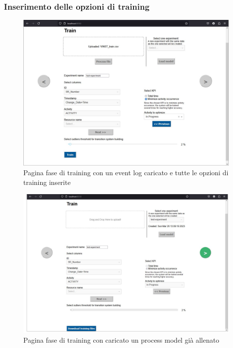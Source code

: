 \subsubsection{Inserimento delle opzioni di training}

\begin{figure}[H] 
    \centering 
    \includegraphics[width=0.7\columnwidth]{immagini/pag-train-loaded-event-log.jpg} 
    \caption{Pagina fase di training con un event log caricato e tutte le opzioni di training inserite}
    \label{fig:opzioni-training}
\end{figure}

\begin{figure}[H] 
    \centering 
    \includegraphics[width=0.7\columnwidth]{immagini/pag-train-model-loaded.jpg} 
    \caption{Pagina fase di training con caricato un process model già allenato}
    \label{fig:caricamento-modello}
\end{figure}

